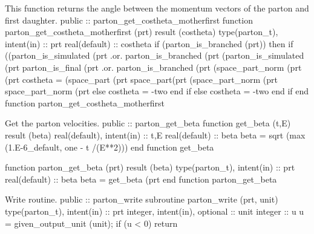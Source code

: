 \eatline
\nwendcode{}This function returns the angle between the momentum vectors of the
parton and first daughter.
\nwenddocs{}\plusendmoddef
  public :: parton_get_costheta_motherfirst
\nwendcode{}\plusendmoddef
  function parton_get_costheta_motherfirst (prt) result (costheta)
    type(parton_t), intent(in) :: prt
    real(default) :: costheta
    if (parton_is_branched (prt)) then
       if ((parton_is_simulated (prt%
            .or. parton_is_branched (prt%
            (parton_is_simulated (prt%
            parton_is_final (prt%
            .or. parton_is_branched (prt%
            (space_part_norm (prt%
            (prt%
          costheta = (space_part (prt%
               space_part(prt%
               (space_part_norm (prt%
                space_part_norm (prt%
       else
          costheta = -two
       end if
    else
       costheta = -two
    end if
  end function parton_get_costheta_motherfirst

\eatline
\nwendcode{}Get the parton velocities.
\nwenddocs{}\plusendmoddef
  public :: parton_get_beta
\nwendcode{}\nwdocspar
\nwenddocs{}\plusendmoddef
  function get_beta (t,E) result (beta)
    real(default), intent(in) :: t,E
    real(default) :: beta
    beta = sqrt (max (1.E-6_default, one - t /(E**2)))
  end function get_beta

  function parton_get_beta (prt) result (beta)
    type(parton_t), intent(in) :: prt
    real(default) :: beta
    beta = get_beta (prt%
  end function parton_get_beta

\eatline
\nwendcode{}Write routine.
\nwenddocs{}\plusendmoddef
  public :: parton_write
\nwendcode{}\plusendmoddef
  subroutine parton_write (prt, unit)
    type(parton_t), intent(in) :: prt
    integer, intent(in), optional :: unit
    integer :: u
    u = given_output_unit (unit); if (u < 0) return

